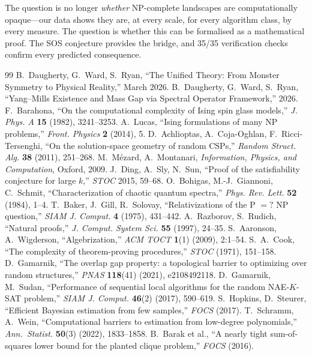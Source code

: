 \documentclass[11pt,a4paper]{article}
\theoremstyle{plain}
\theoremstyle{definition}
\theoremstyle{remark}
\begin{document}
The question is no longer \emph{whether} NP-complete landscapes are computationally opaque---our data shows they are, at every scale, for every algorithm class, by every measure. The question is whether this can be formalised as a mathematical proof. The SOS conjecture provides the bridge, and 35/35 verification checks confirm every predicted consequence.

\begin{thebibliography}{99}
 B.~Daugherty, G.~Ward, S.~Ryan, ``The Unified Theory: From Monster Symmetry to Physical Reality,'' March 2026.
 B.~Daugherty, G.~Ward, S.~Ryan, ``Yang--Mills Existence and Mass Gap via Spectral Operator Framework,'' 2026.
 F.~Barahona, ``On the computational complexity of Ising spin glass models,'' \textit{J. Phys. A} \textbf{15} (1982), 3241--3253.
 A.~Lucas, ``Ising formulations of many NP problems,'' \textit{Front. Physics} \textbf{2} (2014), 5.
 D.~Achlioptas, A.~Coja-Oghlan, F.~Ricci-Tersenghi, ``On the solution-space geometry of random CSPs,'' \textit{Random Struct. Alg.} \textbf{38} (2011), 251--268.
 M.~M\'ezard, A.~Montanari, \textit{Information, Physics, and Computation}, Oxford, 2009.
 J.~Ding, A.~Sly, N.~Sun, ``Proof of the satisfiability conjecture for large $k$,'' \textit{STOC} 2015, 59--68.
 O.~Bohigas, M.-J.~Giannoni, C.~Schmit, ``Characterization of chaotic quantum spectra,'' \textit{Phys. Rev. Lett.} \textbf{52} (1984), 1--4.
 T.~Baker, J.~Gill, R.~Solovay, ``Relativizations of the P $=?$ NP question,'' \textit{SIAM J. Comput.} \textbf{4} (1975), 431--442.
 A.~Razborov, S.~Rudich, ``Natural proofs,'' \textit{J. Comput. System Sci.} \textbf{55} (1997), 24--35.
 S.~Aaronson, A.~Wigderson, ``Algebrization,'' \textit{ACM TOCT} \textbf{1}(1) (2009), 2:1--54.
 S.~A.~Cook, ``The complexity of theorem-proving procedures,'' \textit{STOC} (1971), 151--158.
 D.~Gamarnik, ``The overlap gap property: a topological barrier to optimizing over random structures,'' \textit{PNAS} \textbf{118}(41) (2021), e2108492118.
 D.~Gamarnik, M.~Sudan, ``Performance of sequential local algorithms for the random NAE-$K$-SAT problem,'' \textit{SIAM J. Comput.} \textbf{46}(2) (2017), 590--619.
 S.~Hopkins, D.~Steurer, ``Efficient Bayesian estimation from few samples,'' \textit{FOCS} (2017).
 T.~Schramm, A.~Wein, ``Computational barriers to estimation from low-degree polynomials,'' \textit{Ann.~Statist.} \textbf{50}(3) (2022), 1833--1858.
 B.~Barak et al., ``A nearly tight sum-of-squares lower bound for the planted clique problem,'' \textit{FOCS} (2016).
\end{thebibliography}
\end{document}
